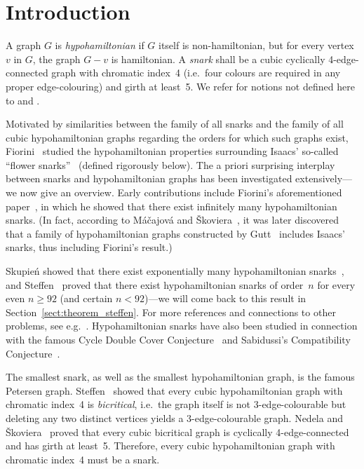 \documentclass{amcjoucc}
\begin{document}
\section{Introduction}

A graph $G$ is \emph{hypohamiltonian} if $G$ itself is non-hamiltonian, but for every vertex $v$ in $G$, the graph $G - v$ is hamiltonian. A \emph{snark} shall be a cubic cyclically 4-edge-connected graph with chromatic index~4 (i.e.\ four colours are required in any proper edge-colouring) and girth at least~5. We refer for notions not defined here to \cite{St01} and \cite{Di10}.

Motivated by similarities between the family of all snarks and the family of all cubic hypohamiltonian graphs regarding the orders for which such graphs exist, Fiorini~\cite{Fi83} studied the hypohamiltonian properties surrounding Isaacs' so-called ``flower snarks''~\cite{Is75} (defined rigorously below). The a priori surprising interplay between snarks and hypohamiltonian graphs has been investigated extensively---we now give an overview. Early contributions include Fiorini's aforementioned paper~\cite{Fi83}, in which he showed that there exist infinitely many hypohamiltonian snarks. (In fact, according to M\'{a}\v{c}ajov\'{a} and \v{S}koviera~\cite{MS07}, it was later discovered that a family of hypohamiltonian graphs constructed by Gutt~\cite{Gu77} includes Isaacs' snarks, thus including Fiorini's result.)

Skupie\'n showed that there exist exponentially many hypohamiltonian snarks~\cite{Sk07}, and Steffen~\cite{St01} proved that there exist hypohamiltonian snarks of order~$n$ for every even $n \ge 92$ (and certain $n < 92$)---we will come back to this result in Section~\ref{sect:theorem_steffen}. For more references and connections to other problems, see e.g.~\cite{MS07,Sk07,BGHM13,steffen20151}. Hypohamiltonian snarks have also been studied in connection with the famous Cycle Double Cover Conjecture~\cite{BGHM13} and Sabidussi's Compatibility Conjecture~\cite{FH09}. 

The smallest snark, as well as the smallest hypohamiltonian graph, is the famous Petersen graph. Steffen~\cite{St98} showed that every cubic hypohamiltonian graph with chromatic index~4 is \emph{bicritical}, i.e.\ the graph itself is not 3-edge-colourable but deleting any two distinct vertices yields a 3-edge-colourable graph. Nedela and \v{S}koviera~\cite{NS96} proved that every cubic bicritical graph is cyclically 4-edge-connected and has girth at least~5. Therefore, every cubic hypohamiltonian graph with chromatic index~4 must be a snark.
\end{document}
